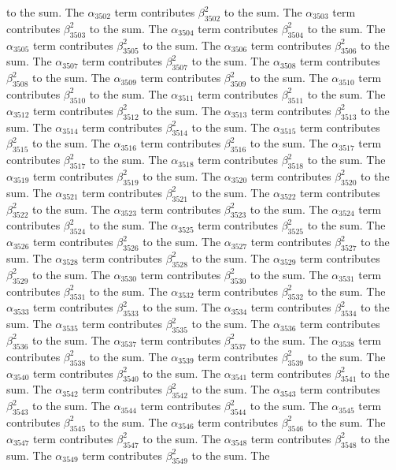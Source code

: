 \begin{lemma}
to the sum. The $\alpha_{3502}$ term contributes $\beta_{3502}^{2}$ to the sum. The $\alpha_{3503}$ term contributes $\beta_{3503}^{2}$ to the sum. The $\alpha_{3504}$ term contributes $\beta_{3504}^{2}$ to the sum. The $\alpha_{3505}$ term contributes $\beta_{3505}^{2}$ to the sum. The $\alpha_{3506}$ term contributes $\beta_{3506}^{2}$ to the sum. The $\alpha_{3507}$ term contributes $\beta_{3507}^{2}$ to the sum. The $\alpha_{3508}$ term contributes $\beta_{3508}^{2}$ to the sum. The $\alpha_{3509}$ term contributes $\beta_{3509}^{2}$ to the sum. The $\alpha_{3510}$ term contributes $\beta_{3510}^{2}$ to the sum. The $\alpha_{3511}$ term contributes $\beta_{3511}^{2}$ to the sum. The $\alpha_{3512}$ term contributes $\beta_{3512}^{2}$ to the sum. The $\alpha_{3513}$ term contributes $\beta_{3513}^{2}$ to the sum. The $\alpha_{3514}$ term contributes $\beta_{3514}^{2}$ to the sum. The $\alpha_{3515}$ term contributes $\beta_{3515}^{2}$ to the sum. The $\alpha_{3516}$ term contributes $\beta_{3516}^{2}$ to the sum. The $\alpha_{3517}$ term contributes $\beta_{3517}^{2}$ to the sum. The $\alpha_{3518}$ term contributes $\beta_{3518}^{2}$ to the sum. The $\alpha_{3519}$ term contributes $\beta_{3519}^{2}$ to the sum. The $\alpha_{3520}$ term contributes $\beta_{3520}^{2}$ to the sum. The $\alpha_{3521}$ term contributes $\beta_{3521}^{2}$ to the sum. The $\alpha_{3522}$ term contributes $\beta_{3522}^{2}$ to the sum. The $\alpha_{3523}$ term contributes $\beta_{3523}^{2}$ to the sum. The $\alpha_{3524}$ term contributes $\beta_{3524}^{2}$ to the sum. The $\alpha_{3525}$ term contributes $\beta_{3525}^{2}$ to the sum. The $\alpha_{3526}$ term contributes $\beta_{3526}^{2}$ to the sum. The $\alpha_{3527}$ term contributes $\beta_{3527}^{2}$ to the sum. The $\alpha_{3528}$ term contributes $\beta_{3528}^{2}$ to the sum. The $\alpha_{3529}$ term contributes $\beta_{3529}^{2}$ to the sum. The $\alpha_{3530}$ term contributes $\beta_{3530}^{2}$ to the sum. The $\alpha_{3531}$ term contributes $\beta_{3531}^{2}$ to the sum. The $\alpha_{3532}$ term contributes $\beta_{3532}^{2}$ to the sum. The $\alpha_{3533}$ term contributes $\beta_{3533}^{2}$ to the sum. The $\alpha_{3534}$ term contributes $\beta_{3534}^{2}$ to the sum. The $\alpha_{3535}$ term contributes $\beta_{3535}^{2}$ to the sum. The $\alpha_{3536}$ term contributes $\beta_{3536}^{2}$ to the sum. The $\alpha_{3537}$ term contributes $\beta_{3537}^{2}$ to the sum. The $\alpha_{3538}$ term contributes $\beta_{3538}^{2}$ to the sum. The $\alpha_{3539}$ term contributes $\beta_{3539}^{2}$ to the sum. The $\alpha_{3540}$ term contributes $\beta_{3540}^{2}$ to the sum. The $\alpha_{3541}$ term contributes $\beta_{3541}^{2}$ to the sum. The $\alpha_{3542}$ term contributes $\beta_{3542}^{2}$ to the sum. The $\alpha_{3543}$ term contributes $\beta_{3543}^{2}$ to the sum. The $\alpha_{3544}$ term contributes $\beta_{3544}^{2}$ to the sum. The $\alpha_{3545}$ term contributes $\beta_{3545}^{2}$ to the sum. The $\alpha_{3546}$ term contributes $\beta_{3546}^{2}$ to the sum. The $\alpha_{3547}$ term contributes $\beta_{3547}^{2}$ to the sum. The $\alpha_{3548}$ term contributes $\beta_{3548}^{2}$ to the sum. The $\alpha_{3549}$ term contributes $\beta_{3549}^{2}$ to the sum. The 
\end{lemma}
